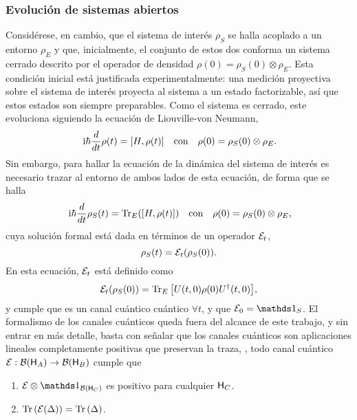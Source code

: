 \subsubsection{Evolución de sistemas abiertos}
Considérese, en cambio, que el sistema de interés $\rho_{S}$ se halla acoplado a un entorno $\rho_{E}$ y que, inicialmente, el conjunto de estos dos conforma un sistema cerrado descrito por el operador de densidad $\rho(0)=\rho_{S}(0)\otimes\rho_{E}$. Esta condición inicial está justificada experimentalmente: una medición proyectiva sobre el sistema de interés proyecta al sistema a un estado factorizable, así que estos estados son siempre preparables. Como el sistema es cerrado, este evoluciona siguiendo la ecuación de Liouville-von Neumann,
\begin{align}
    \rmi\hbar\frac{d}{d t} \rho(t)=[H,\rho(t)] && \text{con} && \rho(0)=\rho_{S}(0)\otimes\rho_{E}\rlap{.}\nonumber
\end{align}
Sin embargo, para hallar la ecuación de la dinámica del sistema de interés es necesario trazar al entorno de ambos lados de esta ecuación, de forma que se halla
\begin{align}
    \rmi\hbar\frac{d}{d t} \rho_{S}(t)=\Tr_{E}([H,\rho(t)]) && \text{con} && \rho(0)=\rho_{S}(0)\otimes\rho_{E}\rlap{,}\nonumber
\end{align}
cuya solución formal está dada en términos de un operador $\mathcal{E}_{t}$,
\begin{equation}
    \rho_{S}(t)=\mathcal{E}_{t}(\rho_{S}(0)).\nonumber
\end{equation}
En esta ecuación, $\mathcal{E}_{t}$ está definido como
 \begin{equation}
    \mathcal{E}_{t}(\rho_{S}(0))=\Tr_{E}\qty[U(t,0)\rho(0)U^{\dag}(t,0)],\nonumber
 \end{equation}
 y cumple que es un canal cuántico  cuántico $\forall t$, y que $\mcE_{0}=\Id_{S}$. El formalismo de los canales cuánticos queda fuera del alcance de este trabajo, y sin entrar en más detalle, basta con señalar que los canales cuánticos son aplicaciones lineales completamente positivas que preservan la traza, \ie, todo canal cuántico $\mathcal{E}:\mathcal{B}({\sf H}_{A})\rightarrow \mathcal{B}({\sf H}_{B})$ cumple que \cite{Watrous}
 \begin{enumerate}
    \item $\mcE\otimes \Id_{\mcB(\hilbert_{C})}$ es positivo para cualquier ${\sf H}_{C}$.
    \item $\Tr\qty(\mathcal{E}(\Delta))=\Tr\qty(\Delta)$.
 \end{enumerate}
